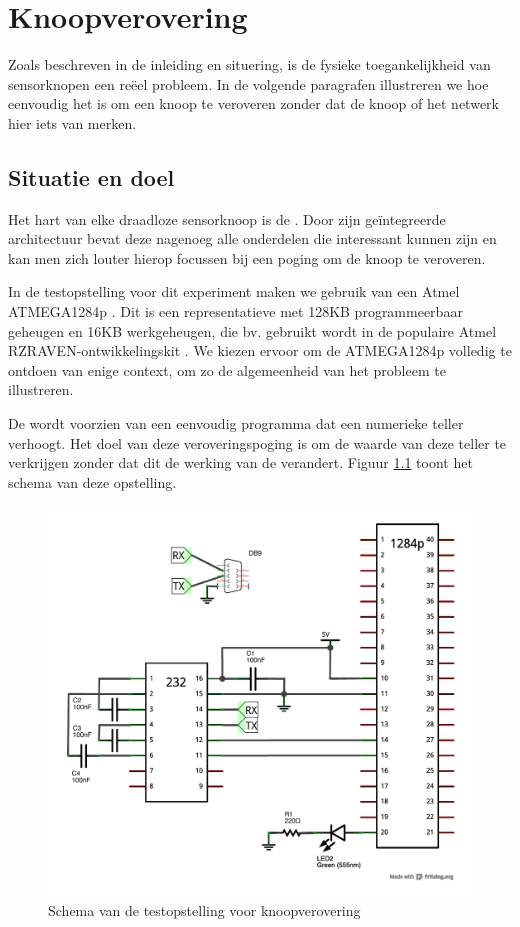 
\chapter{Knoopverovering}
\label{appendix:node-capture}

Zoals beschreven in de inleiding en situering, is de fysieke toegankelijkheid
van sensorknopen een re\"eel probleem. In de volgende paragrafen illustreren we
hoe eenvoudig het is om een knoop te veroveren zonder dat de knoop of het
netwerk hier iets van merken.

\section{Situatie en doel}

Het hart van elke draadloze sensorknoop is de \mcu. Door zijn ge\"integreerde
architectuur bevat deze nagenoeg alle onderdelen die interessant kunnen zijn en
kan men zich louter hierop focussen bij een poging om de knoop te veroveren.

In de testopstelling voor dit experiment maken we gebruik van een Atmel
ATMEGA1284p \citep{datasheet:atmega1284p}. Dit is een representatieve \mcu met
128KB programmeerbaar geheugen en 16KB werkgeheugen, die bv. gebruikt wordt in
de populaire Atmel RZRAVEN-ontwikkelingskit \citep{manual:rzraven}. We kiezen
ervoor om de ATMEGA1284p volledig te ontdoen van enige context, om zo de
algemeenheid van het probleem te illustreren.

De \mcu wordt voorzien van een eenvoudig programma dat een numerieke teller
verhoogt. Het doel van deze veroveringspoging is om de waarde van deze teller
te verkrijgen zonder dat dit de werking van de \mcu verandert. Figuur
\ref{fig:node-capture-schematic} toont het schema van deze opstelling.

\begin{figure}[ht]
  \centering
  \includegraphics[width=0.7\linewidth]{resources/node-capture-schematic.pdf}
  \caption{Schema van de testopstelling voor knoopverovering}
  \label{fig:node-capture-schematic}
\end{figure}

